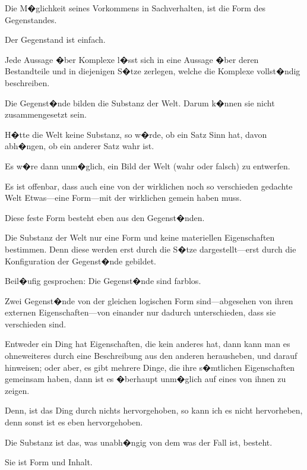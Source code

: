 \begin{propositions}
{Die M�glichkeit seines Vorkommens in Sachverhalten,
ist die Form des Gegenstandes.}


{Der Gegenstand ist einfach.}


{Jede Aussage �ber Komplexe l�sst sich in eine
Aussage �ber deren Bestandteile und in diejenigen
S�tze zerlegen, welche die Komplexe vollst�ndig
beschreiben.}


{Die Gegenst�nde bilden die Substanz der Welt.
Darum k�nnen sie nicht zusammengesetzt sein.}


{H�tte die Welt keine Substanz, so w�rde, ob ein
Satz Sinn hat, davon abh�ngen, ob ein anderer Satz
wahr ist.}


{Es w�re dann unm�glich, ein Bild der Welt
(wahr oder falsch) zu entwerfen.}


{Es ist offenbar, dass auch eine von der wirklichen
noch so verschieden gedachte Welt Etwas---eine
Form---mit der wirklichen gemein haben muss.}


{Diese feste Form besteht eben aus den Gegenst�nden.}


{Die Substanz der Welt  nur eine Form und
keine materiellen Eigenschaften bestimmen. Denn
diese werden erst durch die S�tze dar\-ge\-stellt---erst
durch die Konfiguration der Gegenst�nde gebildet.}


{Beil�ufig gesprochen: Die Gegenst�nde sind
farblos.}


{Zwei Gegenst�nde von der gleichen logischen
Form sind---ab\-ge\-se\-hen von ihren externen Eigenschaften---von
einander nur dadurch unterschieden,
dass sie verschieden sind.}


{Entweder ein Ding hat Eigenschaften, die kein
anderes hat, dann kann man es ohneweiteres durch
eine Beschreibung aus den anderen herausheben,
und darauf hinweisen; oder aber, es gibt mehrere
Dinge, die ihre s�mtlichen Eigenschaften gemeinsam
haben, dann ist es �berhaupt unm�glich auf
eines von ihnen zu zeigen.

Denn, ist das Ding durch nichts hervorgehoben,
so kann ich es nicht hervorheben, denn sonst ist
es eben hervorgehoben.}


{Die Substanz ist das, was unabh�ngig von dem
was der Fall ist, besteht.}


{Sie ist Form und Inhalt.}



\end{propositions}
